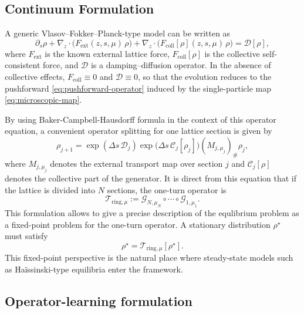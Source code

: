 \documentclass[11pt,a4paper]{article}
\begin{document}
\begin{sloppypar}
\subsection{Continuum Formulation}
A generic Vlasov--Fokker--Planck-type model can be written as
\begin{equation}
 \partial_s \rho
 + \nabla_z \cdot \big(F_{\mathrm{ext}}(z,s,\mu)\,\rho\big)
 + \nabla_z \cdot \big(F_{\mathrm{coll}}[\rho](z,s,\mu)\,\rho\big)
 = \mathcal{D}[\rho],
 \label{eq:vfp-generic}
\end{equation}
where $F_{\mathrm{ext}}$ is the known external lattice force, $F_{\mathrm{coll}}[\rho]$ is the collective self-consistent force, and $\mathcal{D}$ is a damping--diffusion operator. In the absence of collective effects, $F_{\mathrm{coll}} \equiv 0$ and $\mathcal{D}\equiv 0$, so that the evolution reduces to the pushforward \eqref{eq:pushforward-operator} induced by the single-particle map \eqref{eq:microscopic-map}.

By using Baker-Campbell-Hausdorff formula in the context of this operator equation, a convenient operator splitting for one lattice section is given by
\begin{equation}
 \rho_{j+1}
=
 \exp(\Delta s\,\mathcal{D}_j)
 \exp\big(\Delta s\,\mathcal{C}_j[\rho_j]\big)
 (M_{j,\mu_j})_\#\rho_j,
 \label{eq:section-splitting}
\end{equation}
where $M_{j,\mu_j}$ denotes the external transport map over section $j$ and $\mathcal{C}_j[\rho]$ denotes the collective part of the generator. It is direct from this equation that if the lattice is divided into $N$ sections, the one-turn operator is
\begin{equation}
 \mathcal{T}_{\mathrm{ring},\mu}
 :=
 \mathcal{G}_{N,\mu_N}\circ \cdots \circ \mathcal{G}_{1,\mu_1}.
 \label{eq:ring-map}
\end{equation}
This formulation allows to give a precise description of the equlibrium problem as a fixed-point problem for the one-turn operator. A stationary distribution $\rho^\star$ must satisfy
\begin{equation}
 \rho^\star = \mathcal{T}_{\mathrm{ring},\mu}[\rho^\star].
 \label{eq:fixed-point-equilibrium}
\end{equation}
This fixed-point perspective is the natural place where steady-state models such as Ha\"issinski-type equilibria enter the framework.

\subsection{Operator-learning formulation}
\label{subsubsec:operator-learning-formulation}


\end{sloppypar}
\end{document}
